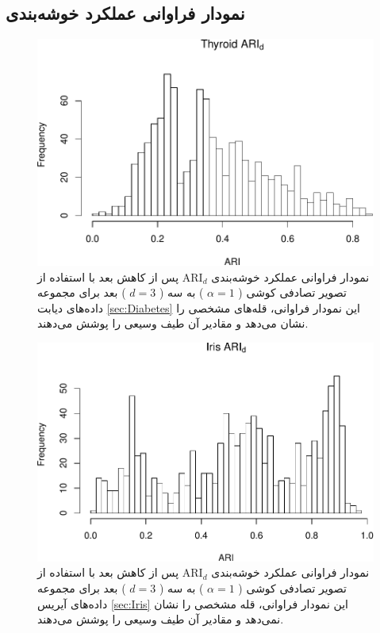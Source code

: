 \subsection{نمودار فراوانی عملکرد خوشه‌بندی}

\begin{figure}[H]
\centering
\includegraphics[width=0.7\linewidth]{Report_files/figure-latex/unnamed-chunk-12-1}
\caption{
نمودار فراوانی عملکرد خوشه‌بندی 
$\mathrm{ARI}_d$
پس از کاهش بعد با استفاده از تصویر تصادفی
کوشی (%
$\alpha=1$%
)
به
سه (%
$d=3$%
)
بعد برای مجموعه داده‌های
دیابت
\ref{sec:Diabetes}
این نمودار فراوانی،
قله‌های
مشخصی را نشان 
می‌دهد
و مقادیر آن طیف 
وسیعی را پوشش می‌دهند.
}
\end{figure}

\begin{figure}[H]
\centering
\includegraphics[width=0.7\linewidth]{Report_files/figure-latex/unnamed-chunk-12-2}
\caption{
نمودار فراوانی عملکرد خوشه‌بندی 
$\mathrm{ARI}_d$
پس از کاهش بعد با استفاده از تصویر تصادفی
کوشی (%
$\alpha=1$%
)
به
سه (%
$d=3$%
)
بعد برای مجموعه داده‌های
آیریس
\ref{sec:Iris}
این نمودار فراوانی،
قله
مشخصی را نشان 
نمی‌دهد
و مقادیر آن طیف 
وسیعی را پوشش می‌دهند.
}
\end{figure}

